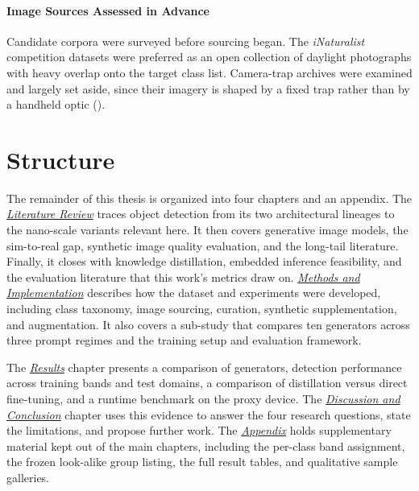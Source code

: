 \paragraph{Image Sources Assessed in Advance}
Candidate corpora were surveyed before sourcing began. The \textit{iNaturalist} competition datasets \cite{hornINaturalistSpeciesClassification2018} were preferred as an open collection of daylight photographs with heavy overlap onto the target class list. Camera-trap archives were examined and largely set aside, since their imagery is shaped by a fixed trap rather than by a handheld optic ().

\section{Structure}\label{sec:structure}

The remainder of this thesis is organized into four chapters and an appendix. The \hyperref[chapter:literature_review]{\textit{Literature Review}} traces object detection from its two architectural lineages to the nano-scale variants relevant here. It then covers generative image models, the sim-to-real gap, synthetic image quality evaluation, and the long-tail literature. Finally, it closes with knowledge distillation, embedded inference feasibility, and the evaluation literature that this work's metrics draw on. \hyperref[chapter:methods_implementation]{\textit{Methods and Implementation}} describes how the dataset and experiments were developed, including class taxonomy, image sourcing, curation, synthetic supplementation, and augmentation. It also covers a sub-study that compares ten generators across three prompt regimes and the training setup and evaluation framework.

The \hyperref[chapter:results]{\textit{Results}} chapter presents a comparison of generators, detection performance across training bands and test domains, a comparison of distillation versus direct fine-tuning, and a runtime benchmark on the proxy device. The \hyperref[chapter:discussion_conclusion]{\textit{Discussion and Conclusion}} chapter uses this evidence to answer the four research questions, state the limitations, and propose further work. The \hyperref[appendix]{\textit{Appendix}} holds supplementary material kept out of the main chapters, including the per-class band assignment, the frozen look-alike group listing, the full result tables, and qualitative sample galleries.
